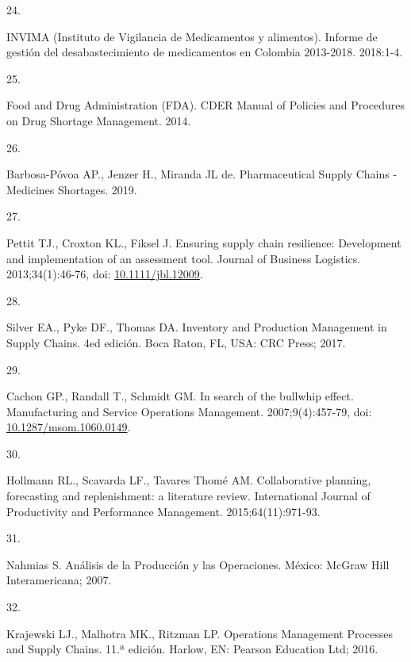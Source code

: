 \documentclass[
]{book}
\newlength{\cslhangindent}
\newlength{\csllabelwidth}
\newlength{\cslentryspacingunit} %
\newenvironment{CSLReferences}[2] %
 {%
  \setlength{\parindent}{0pt}
  \ifodd #1
  \let\oldpar\par
  \def\par{\hangindent=\cslhangindent\oldpar}
  \fi
  \setlength{\parskip}{#2\cslentryspacingunit}
 }%
 {}
\newcommand{\CSLLeftMargin}[1]{\parbox[t]{\csllabelwidth}{#1}}
\newcommand{\CSLRightInline}[1]{\parbox[t]{\linewidth - \csllabelwidth}{#1}\break}
\begin{document}
\begin{CSLReferences}{0}{0}
\leavevmode{}%
\CSLLeftMargin{24. }
\CSLRightInline{INVIMA (Instituto de Vigilancia de Medicamentos y alimentos). {Informe de gesti{ó}n del desabastecimiento de medicamentos en Colombia 2013-2018}. 2018:1-4.}

\leavevmode{}%
\CSLLeftMargin{25. }
\CSLRightInline{Food and Drug Administration (FDA). {CDER Manual of Policies and Procedures on Drug Shortage Management}. 2014.}

\leavevmode{}%
\CSLLeftMargin{26. }
\CSLRightInline{Barbosa-Póvoa AP., Jenzer H., Miranda JL de. {Pharmaceutical Supply Chains - Medicines Shortages}. 2019.}

\leavevmode{}%
\CSLLeftMargin{27. }
\CSLRightInline{Pettit TJ., Croxton KL., Fiksel J. {Ensuring supply chain resilience: Development and implementation of an assessment tool}. Journal of Business Logistics. 2013;34(1):46-76, doi: \href{https://doi.org/10.1111/jbl.12009}{10.1111/jbl.12009}.}

\leavevmode{}%
\CSLLeftMargin{28. }
\CSLRightInline{Silver EA., Pyke DF., Thomas DA. {Inventory and Production Management in Supply Chains}. 4ed edición. Boca Raton, FL, USA: CRC Press; 2017.}

\leavevmode{}%
\CSLLeftMargin{29. }
\CSLRightInline{Cachon GP., Randall T., Schmidt GM. {In search of the bullwhip effect}. Manufacturing and Service Operations Management. 2007;9(4):457-79, doi: \href{https://doi.org/10.1287/msom.1060.0149}{10.1287/msom.1060.0149}.}

\leavevmode{}%
\CSLLeftMargin{30. }
\CSLRightInline{Hollmann RL., Scavarda LF., Tavares Thomé AM. {Collaborative planning, forecasting and replenishment: a literature review}. International Journal of Productivity and Performance Management. 2015;64(11):971-93.}

\leavevmode{}%
\CSLLeftMargin{31. }
\CSLRightInline{Nahmias S. {An{á}lisis de la Producci{ó}n y las Operaciones}. M{é}xico: McGraw Hill Interamericana; 2007.}

\leavevmode{}%
\CSLLeftMargin{32. }
\CSLRightInline{Krajewski LJ., Malhotra MK., Ritzman LP. {Operations Management Processes and Supply Chains}. 11.ª edición. Harlow, EN: Pearson Education Ltd; 2016.}


\end{CSLReferences}
\end{document}

